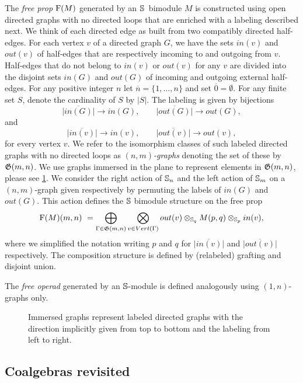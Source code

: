 The \textit{free prop} $\F(M)$ generated by an \mbox{$\S$ bimodule} $M$ is constructed using open directed graphs with no directed loops that are enriched with a labeling described next.
We think of each directed edge as built from two compatibly directed half-edges.
For each vertex $v$ of a directed graph $G$, we have the sets $in(v)$ and $out(v)$ of half-edges that are respectively incoming to and outgoing from $v$.
Half-edges that do not belong to $in(v)$ or $out(v)$ for any $v$ are divided into the disjoint sets $in(G)$ and $out(G)$ of incoming and outgoing external half-edges.
For any positive integer $n$ let $\overline{n} = \{1,\dots,n\}$ and set $\overline{0} = \emptyset$.
For any finite set $S$, denote the cardinality of $S$ by $|S|$.
The labeling is given by bijections  
\[
\overline{|in(G)|}\to in(G), \qquad
\overline{|out(G)|}\to out(G),
\]
and
\[
\overline{|in(v)|}\to in(v), \qquad
\overline{|out(v)|}\to out(v),
\]
for every vertex $v$.
We refer to the isomorphism classes of such labeled directed graphs with no directed loops as $(n,m)$\textit{-graphs} denoting the set of these by $\G(m,n)$.
We use graphs immersed in the plane to represent elements in $\G(m,n)$, please see \cref{f:immersion}.
We consider the right action of $\S_n$ and the left action of $\S_m$ on a $(n,m)$-graph given respectively by permuting the labels of $in(G)$ and $out(G)$.
This action defines the $\S$ bimodule structure on the free prop
\begin{equation} \label{e:free prop}
\F(M)(m,n) \ = \bigoplus_{\Gamma \in \G(m,n)} \bigotimes_{v \in Vert(\Gamma)} out(v) \otimes_{\S_q} M(p, q) \otimes_{\S_p} in(v),
\end{equation}
where we simplified the notation writing $p$ and $q$ for $\overline{|in(v)|}$ and $\overline{|out(v)|}$ respectively.
The composition structure is defined by (relabeled) grafting and disjoint union.

The \textit{free operad} generated by an $\S$-module is defined analogously using $(1,n)$-graphs only.

\begin{figure}
	
	\caption{Immersed graphs represent labeled directed graphs with the direction implicitly given from top to bottom and the labeling from left to right.}
	\label{f:immersion}
\end{figure}

\subsection{Coalgebras revisited}

